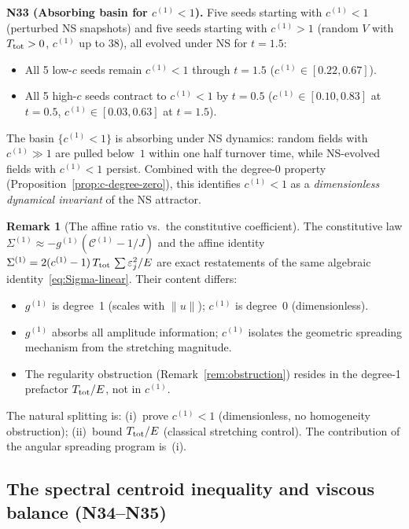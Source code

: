 \documentclass[11pt]{article}
\theoremstyle{definition}
\newtheorem{remark}[theorem]{Remark}
\newcommand{\cC}{\mathcal{C}}
\begin{document}
\medskip\noindent\textbf{N33 (Absorbing basin for
$c^{(1)}<1$).}
Five seeds starting with $c^{(1)}<1$ (perturbed NS
snapshots) and five seeds starting with $c^{(1)}>1$
(random $V$ with $T_{\rm tot}>0$, $c^{(1)}$ up to
$38$), all evolved under NS for $t=1.5$:
\begin{itemize}[leftmargin=2em]
\item All 5 low-$c$ seeds remain $c^{(1)}<1$
  through $t=1.5$ ($c^{(1)}\in[0.22, 0.67]$).
\item All 5 high-$c$ seeds contract to $c^{(1)}<1$
  by $t=0.5$ ($c^{(1)}\in[0.10, 0.83]$ at $t=0.5$,
  $c^{(1)}\in[0.03, 0.63]$ at $t=1.5$).
\end{itemize}
The basin $\{c^{(1)}<1\}$ is absorbing under NS
dynamics: random fields with $c^{(1)}\gg 1$ are
pulled below~$1$ within one half turnover time,
while NS-evolved fields with $c^{(1)}<1$ persist.
Combined with the degree-0 property
(Proposition~\ref{prop:c-degree-zero}), this
identifies $c^{(1)}<1$ as a \emph{dimensionless
dynamical invariant} of the NS attractor.

\begin{remark}[The affine ratio vs.\ the
constitutive coefficient]
\label{rem:c-vs-g}
The constitutive law $\Sigma^{(1)}\approx
-g^{(1)}(\cC^{(1)}-1/J)$ and the affine identity
$\Sigma^{(1)} = 2(c^{(1)}-1)\,T_{\rm tot}\,
\sum\varepsilon_j^2/E$ are exact restatements of
the same algebraic
identity~\eqref{eq:Sigma-linear}.  Their content
differs:
\begin{itemize}[leftmargin=2em]
\item $g^{(1)}$ is degree~1 (scales with $\|u\|$);
  $c^{(1)}$ is degree~0 (dimensionless).
\item $g^{(1)}$ absorbs all amplitude information;
  $c^{(1)}$ isolates the geometric spreading
  mechanism from the stretching magnitude.
\item The regularity obstruction
  (Remark~\ref{rem:obstruction}) resides in the
  degree-1 prefactor $T_{\rm tot}/E$, not in
  $c^{(1)}$.
\end{itemize}
The natural splitting is: (i)~prove $c^{(1)}<1$
(dimensionless, no homogeneity obstruction);
(ii)~bound $T_{\rm tot}/E$ (classical stretching
control).  The contribution of the angular
spreading program is~(i).
\end{remark}


\subsection{The spectral centroid inequality and
viscous balance (N34--N35)}
\label{sec:centroid-inequality}
\end{document}
